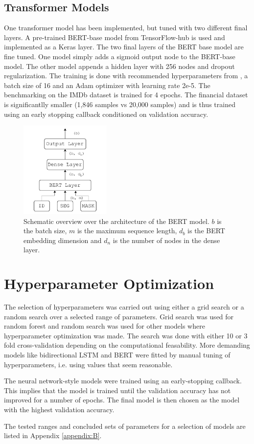 \subsection{Transformer Models}

One transformer model has been implemented, but tuned with two different final layers. A pre-trained BERT-base model from TensorFlow-hub is used and implemented as a Keras layer. The two final layers of the BERT base model are fine tuned. One model simply adds a sigmoid output node to the BERT-base model. The other model appends a hidden layer with 256 nodes and dropout regularization. 
The training is done with recommended hyperparameters from \citeauthor{devlin2018bert}, a batch size of 16 and an Adam optimizer with learning rate 2e-5. 
The benchmarking on the IMDb dataset is trained for 4 epochs. The financial dataset is significantlly smaller (1,846 samples vs 20,000 samples) and is thus trained using an early stopping callback conditioned on validation accuracy.  

\begin{figure}[H]
    \centering
    \includegraphics[width=0.4\textwidth]{Figures/figs-bert-ff.pdf}
    \caption{Schematic overview over the architecture of the BERT model. $b$ is the batch size, $m$ is the maximum sequence length, $d_b$ is the BERT embedding dimension and $d_n$ is the number of nodes in the dense layer.}
\end{figure}


\section{Hyperparameter Optimization}

The selection of hyperparameters was carried out using either a grid search or a random search over a selected range of parameters. Grid search was used for random forest and random search was used for other models where hyperparameter optimization was made. The search was done with either 10 or 3 fold cross-validation depending on the computational feasability. More demanding models like bidirectional LSTM and BERT were fitted by manual tuning of hyperparameters, i.e. using values that seem reasonable. 

The neural network-style models were trained using an early-stopping callback. This implies that the model is trained until the validation accuracy has not improved for a number of epochs. The final model is then chosen as the model with the highest validation accuracy. 

The tested ranges and concluded sets of parameters for a selection of models are listed in Appendix \ref{appendix:B}.